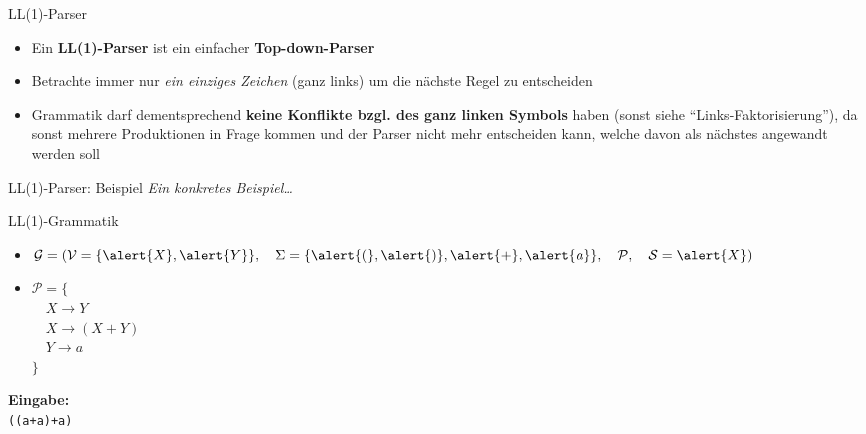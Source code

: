 \documentclass[18pt]{beamer}
\newcommand{\quotes}[1]{``#1''}
\begin{document}
\begin{frame}{LL(1)-Parser}
    \begin{itemize}
        \item Ein \textbf{LL(1)-Parser} ist ein einfacher \textbf{Top-down-Parser}
        \item Betrachte immer nur \textit{ein einziges Zeichen} (ganz links) um die nächste Regel zu entscheiden
        \item Grammatik darf dementsprechend \textbf{keine Konflikte bzgl. des ganz linken Symbols} haben (sonst siehe \quotes{Links-Faktorisierung}),
        da sonst mehrere Produktionen in Frage kommen und der Parser nicht mehr entscheiden kann, welche davon als nächstes angewandt werden soll
    \end{itemize}
\end{frame}

\begin{frame}{LL(1)-Parser: Beispiel}
    \textit{Ein konkretes Beispiel\dots}
    \begin{exampleblock}{LL(1)-Grammatik}
        \begin{itemize}
            \item $\mathcal{G} = (\mathcal{V} = \{\alert{X}, \alert{Y}\}, \quad \Sigma = \{\alert{(}, \alert{)}, \alert{+}, \alert{\mathit{a}}\}, \quad \mathcal{P}, \quad \mathcal{S} = \alert{X})$
            \item $\mathcal{P} = \{$\\
            $\quad X \longrightarrow Y$\\
            $\quad X \longrightarrow (X+Y)$\\
            $\quad Y \longrightarrow \mathit{a}$\\
            $\}$
        \end{itemize}
    \end{exampleblock}
    \vspace{.2in}
    \textbf{Eingabe:}\\
    \vspace{.1in}
    \texttt{((a+a)+a)}\\
\end{frame}
\end{document}
